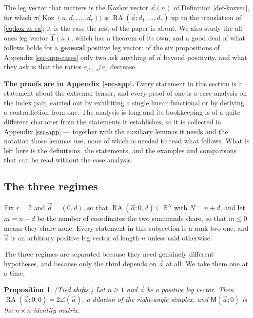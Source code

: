 \documentclass[11pt, a4paper, abstract=yes]{scrartcl}
\theoremstyle{definition}
\theoremstyle{remark}
\theoremstyle{plain}
\newtheorem{proposition}[definition]{Proposition}
\newcommand{\Koz}{\operatorname{Koz}}
\newcommand{\rasimp}{\angle}
\newcommand{\RA}{\operatorname{RA}}
\newcommand{\kozvec}{\vec\kappa}
\newcommand{\extten}{\mathsf{M}}
\newcommand{\proj}{\pi}
\newcommand{\onesvec}{\vec{\mathbf 1}}
\begin{document}
The leg vector that matters is the Kozlov vector \(\kozvec(n)\) of Definition \ref{def-kozvec}, for
which \(\proj\bigl(\Koz(n;d_1,\dots,d_r)\bigr)\) is \(\RA(\vec a;d_1,\dots,d_r)\) up to the
translation of \eqref{eq:koz-as-ra}; it is the
case the rest of the paper is about. We also study the all-ones leg vector \(\onesvec(n)\), which has
a theorem of its own; and a good deal of what
follows holds for a \textbf{general} positive leg vector: of the six propositions of
Appendix \ref{sec-app-cases} only two ask anything of \(\vec a\) beyond positivity, and what they ask
is that the ratios \(a_{d+s}/a_s\) decrease.

\textbf{The proofs are in Appendix \ref{sec-app}.} Every statement in this section is a statement about the
extremal tensor, and every proof of one is a case analysis on the index pair, carried out by
exhibiting a single linear functional or by deriving a contradiction from one. The analysis is long
and its bookkeeping is of a quite different character from the statements it establishes, so it is
collected in Appendix \ref{sec-app} --- together with the auxiliary lemmas it needs and the notation
those lemmas use, none of which is needed to read what follows. What is left here is the
definitions, the statements, and the examples and comparisons that can be read without the case
analysis.
\subsection{The three regimes}
\label{sec:org55826e6}

Fix \(r=2\) and \(\vec d=(0,d)\), so that \(\RA(\vec a;0,d)\subseteq\mathbb R^N\) with
\(N=n+d\), and let \(m=n-d\) be the number of coordinates the two summands share, so that
\(m\le0\) means they share none. Every statement in this subsection is a rank-two
one, and \(\vec a\) is an arbitrary positive leg vector of length \(n\) unless said otherwise.

The three regimes are separated because they need genuinely different hypotheses, and because only
the third depends on \(\vec a\) at all. We take them one at a time.

\begin{proposition}
(\emph{Tied shifts.}) Let \(n\ge1\) and \(\vec a\) be a positive leg vector. Then
\(\RA(\vec a;0,0)=2\rasimp(\vec a)\), a dilation of the right-angle simplex, and
\(\extten(\vec a;0)\) is the \(n\times n\) identity matrix.
\label{prop:regimes-tie}
\label{prop-regimes-tie}
\end{proposition}
\end{document}
